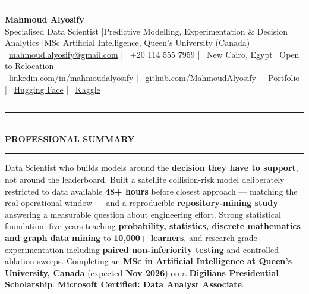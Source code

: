 \documentclass[10pt, a4paper]{article}
\newcommand{\faEnvelope}{}\newcommand{\faPhone}{}\newcommand{\faMapMarker}{}%
\newcommand{\faLinkedin}{}\newcommand{\faGithub}{}\newcommand{\faRobot}{}%
\newcommand{\faChartBar}{}\newcommand{\faGlobe}{}%
\newcommand{\cvsection}[1]{%
  \vspace{3pt}%
  {\color{navy}\rule{\linewidth}{1.1pt}}\\[0.5pt]%
  {\color{navy}\bfseries\fontsize{9.5}{11}\selectfont\uppercase{#1}}\\[-4pt]%
  {\color{teal}\rule{\linewidth}{0.6pt}}%
  \vspace{2pt}%
}
\begin{document}
\small

{\color{navy}\rule{\linewidth}{1.5pt}}

\vspace{3pt}
\begin{center}
  {\fontsize{21}{24}\bfseries\color{navy} Mahmoud Alyosify}\\[3pt]
  {\fontsize{10}{12}\color{teal}
    Specialised Data Scientist \enspace|\enspace Predictive Modelling, Experimentation \& Decision Analytics
    \enspace|\enspace MSc Artificial Intelligence, Queen's University (Canada)
}\\[4pt]
  {\color{midgray}
    \faEnvelope\ \href{mailto:mahmoud.alyosify@gmail.com}{mahmoud.alyosify@gmail.com}
    \enspace|\enspace
    \faPhone\ +20 114 555 7959
    \enspace|\enspace
    \faMapMarker\ New Cairo, Egypt \textperiodcentered\ Open to Relocation}\\[2pt]
  {\faLinkedin\ \href{https://linkedin.com/in/mahmoudalyosify}{linkedin.com/in/mahmoudalyosify}
    \enspace|\enspace
    \faGithub\ \href{https://github.com/MahmoudAlyosify}{github.com/MahmoudAlyosify}
    \enspace|\enspace
    \faGlobe\ \href{https://mahmoudalyosifysite.github.io/}{Portfolio}
    \enspace|\enspace
    \faRobot\ \href{https://huggingface.co/mahmoudalyosify}{Hugging Face}
    \enspace|\enspace
    \faChartBar\ \href{https://kaggle.com/mahmoudalyosify}{Kaggle}}
\end{center}

{\color{navy}\rule{\linewidth}{1.5pt}}

\vspace{2pt}

\cvsection{Professional Summary}

{\color{darkgray}\justifying
Data Scientist who builds models around the \textbf{decision they have to support}, not around the leaderboard. Built a satellite collision-risk model deliberately restricted to data available \textbf{48+ hours} before closest approach --- matching the real operational window --- and a reproducible \textbf{repository-mining study} answering a measurable question about engineering effort. Strong statistical foundation: five years teaching \textbf{probability, statistics, discrete mathematics and graph data mining} to \textbf{10,000+ learners}, and research-grade experimentation including \textbf{paired non-inferiority testing} and controlled ablation sweeps. Completing an \textbf{MSc in Artificial Intelligence at Queen's University, Canada} (expected \textbf{Nov 2026}) on a \textbf{Digilians Presidential Scholarship}. \textbf{Microsoft Certified: Data Analyst Associate}.}
\end{document}
